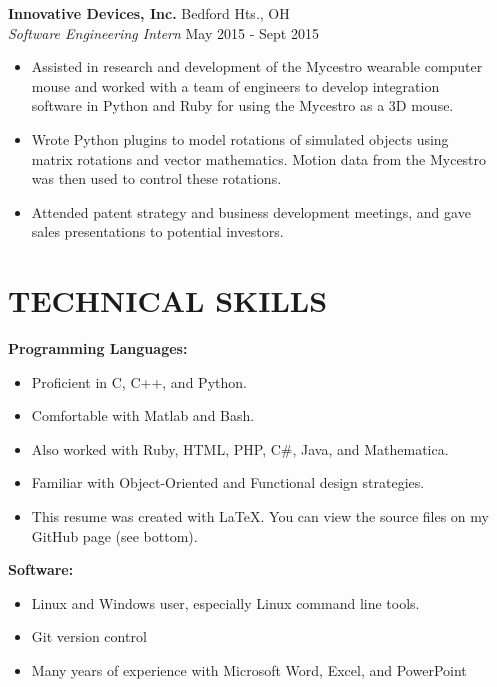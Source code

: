 \documentclass[margin,11pt]{res}
\begin{document}
\begin{resume}
\vspace{-10pt}
\textbf{Innovative Devices, Inc.} \hfill Bedford Hts., OH\\
\textsl{Software Engineering Intern} \hfill May 2015 - Sept 2015
\begin{itemize}
	\itemsep -2pt
    \item Assisted in research and development of the Mycestro wearable computer\\
          mouse and worked with a team of engineers to develop integration\\
          software in Python and Ruby for using the Mycestro as a 3D mouse.
    \item Wrote Python plugins to model rotations of simulated objects using\\
          matrix rotations and vector mathematics. Motion data from the Mycestro\\
          was then used to control these rotations.
    \item Attended patent strategy and business development meetings, and gave\\
          sales presentations to potential investors.
\end{itemize}

\vspace{-10pt}
\section{TECHNICAL SKILLS}
\textbf{Programming Languages:}\\
\vspace{-10pt}
\begin{itemize}
	\itemsep -2pt
    \item Proficient in C, C++, and Python.
    \item Comfortable with Matlab and Bash.
    \item Also worked with Ruby, HTML, PHP, C\#, Java, and Mathematica.
    \item Familiar with Object-Oriented and Functional design strategies.
    \item This resume was created with LaTeX.
          You can view the source files on my GitHub page (see bottom).
\end{itemize}

\vspace{-10pt}
\textbf{Software:}
\begin{itemize}
	\itemsep -2pt
    \item Linux and Windows user, especially Linux command line tools.
    \item Git version control
    \item Many years of experience with Microsoft Word, Excel, and PowerPoint
\end{itemize}


\end{resume}
\end{document}
